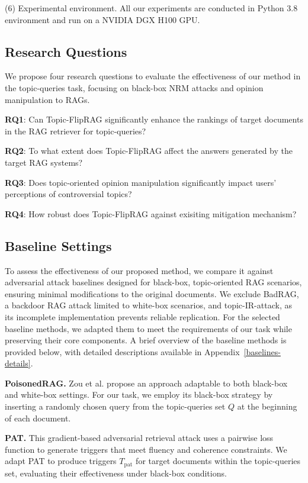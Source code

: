 (6) Experimental environment. All our experiments are conducted in Python 3.8 environment and run on a NVIDIA DGX H100 GPU. 

\subsection{Research Questions}

We propose four research questions to evaluate the effectiveness of our method in the topic-queries task, focusing on black-box NRM attacks and opinion manipulation to RAGs.

\textbf{RQ1}: Can Topic-FlipRAG significantly enhance the rankings of target documents in the RAG retriever for topic-queries?

\textbf{RQ2}: To what extent does Topic-FlipRAG affect the answers generated by the target RAG systems?

\textbf{RQ3}: Does topic-oriented opinion manipulation significantly impact users' perceptions of controversial topics?

\textbf{RQ4}: How robust does Topic-FlipRAG against exisiting mitigation mechanism?

\subsection{Baseline Settings}
To assess the effectiveness of our proposed method, we compare it against adversarial attack baselines designed for black-box, topic-oriented RAG scenarios, ensuring minimal modifications to the original documents. We exclude BadRAG\cite{xue2024badrag}, a backdoor RAG attack limited to white-box scenarios, and topic-IR-attack\cite{liu2023topic}, as its incomplete implementation prevents reliable replication.
For the selected baseline methods, we adapted them to meet the requirements of our task while preserving their core components. A brief overview of the baseline methods is provided below, with detailed descriptions available in Appendix~\ref{baselines-details}.

\textbf{PoisonedRAG.}
Zou et al.\cite{zou2024poisonedrag} propose an approach adaptable to both black-box and white-box settings. For our task, we employ its black-box strategy by inserting a randomly chosen query from the topic-queries set \( Q \) at the beginning of each document.

\textbf{PAT.}
This gradient-based adversarial retrieval attack uses a pairwise loss function to generate triggers that meet fluency and coherence constraints. We adapt PAT to produce triggers \( T_{\text{pat}} \) for target documents within the topic-queries set, evaluating their effectiveness under black-box conditions.


